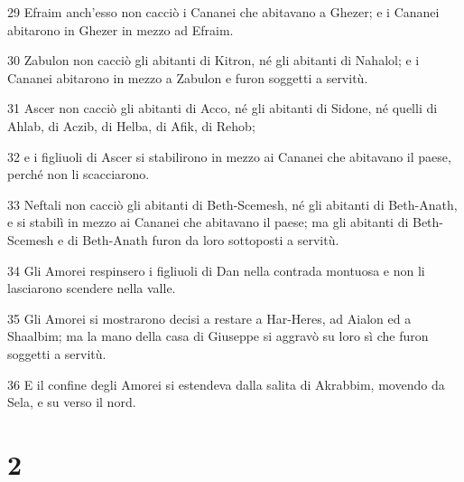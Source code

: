 \par 29 Efraim anch'esso non cacciò i Cananei che abitavano a Ghezer; e i Cananei abitarono in Ghezer in mezzo ad Efraim.
\par 30 Zabulon non cacciò gli abitanti di Kitron, né gli abitanti di Nahalol; e i Cananei abitarono in mezzo a Zabulon e furon soggetti a servitù.
\par 31 Ascer non cacciò gli abitanti di Acco, né gli abitanti di Sidone, né quelli di Ahlab, di Aczib, di Helba, di Afik, di Rehob;
\par 32 e i figliuoli di Ascer si stabilirono in mezzo ai Cananei che abitavano il paese, perché non li scacciarono.
\par 33 Neftali non cacciò gli abitanti di Beth-Scemesh, né gli abitanti di Beth-Anath, e si stabilì in mezzo ai Cananei che abitavano il paese; ma gli abitanti di Beth-Scemesh e di Beth-Anath furon da loro sottoposti a servitù.
\par 34 Gli Amorei respinsero i figliuoli di Dan nella contrada montuosa e non li lasciarono scendere nella valle.
\par 35 Gli Amorei si mostrarono decisi a restare a Har-Heres, ad Aialon ed a Shaalbim; ma la mano della casa di Giuseppe si aggravò su loro sì che furon soggetti a servitù.
\par 36 E il confine degli Amorei si estendeva dalla salita di Akrabbim, movendo da Sela, e su verso il nord.

\chapter{2}

